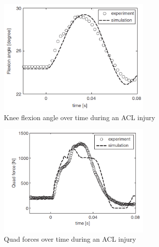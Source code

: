 \begin{figure}[h]
  \begin{center}
    \includegraphics[width=3in]{images/flexangle.PNG}
  \end{center}
  \caption{Knee flexion angle over time during an ACL injury}
  \label{fig:flex_angles}
\end{figure}

\begin{figure}[h]
  \begin{center}
    \includegraphics[width=3in]{images/quadforce.PNG}
  \end{center}
  \caption{Quad forces over time during an ACL injury}
  \label{fig:quad_force}
\end{figure}
